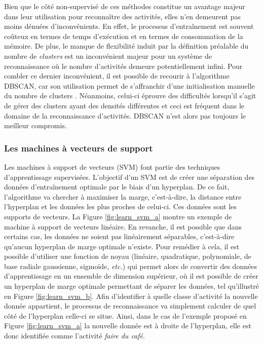 Bien que le côté non-supervisé de ces méthodes constitue un avantage majeur dans leur utilisation pour reconnaître des activités, elles n'en demeurent pas moins dénuées d'inconvénients. En effet, le processus d'entraînement est souvent coûteux en termes de temps d'exécution et en termes de consommation de la mémoire. De plus, le manque de flexibilité induit par la définition préalable du nombre de \textit{clusters} est un inconvénient majeur pour un système de reconnaissance où le nombre d'activités demeure potentiellement infini. Pour combler ce dernier inconvénient, il est possible de recourir à l'algorithme \ac{DBSCAN}, car son utilisation permet de s'affranchir d'une initialisation manuelle du nombre de clusters \citep{Gan2015}. Néanmoins, celui-ci éprouve des difficultés lorsqu'il s'agit de gérer des clusters ayant des densités différentes et ceci est fréquent dans le domaine de la reconnaissance d'activités. \acs{DBSCAN} n'est alors pas toujours le meilleur compromis.

\subsubsection{Les machines à vecteurs de support}

Les machines à support de vecteurs (\ac{SVM}) \citep{Cortes1995} font partie des techniques d'apprentissage supervisées. L'objectif d'un \acs{SVM} est de créer une séparation des données d'entraînement optimale par le biais d'un hyperplan. De ce fait, l'algorithme va chercher à maximiser la marge, c'est-à-dire, la distance entre l'hyperplan et les données les plus proches de celui-ci. Ces données sont les supports de vecteurs. La Figure \ref{fig:learn_svm_a} montre un exemple de machine à support de vecteurs linéaire. En revanche, il est possible que dans certains cas, les données ne soient pas linéairement séparables, c'est-à-dire qu'aucun hyperplan de marge optimale n'existe. Pour remédier à cela, il est possible d'utiliser une fonction de noyau (linéaire, quadratique, polynomiale, de base radiale gaussienne, sigmoïde, \textit{etc.}) qui permet alors de convertir des données d'apprentissage en un ensemble de dimension supérieur, où il est possible de créer un hyperplan de marge optimale permettant de séparer les données, tel qu'illustré en Figure \ref{fig:learn_svm_b}. Afin d'identifier à quelle classe d'activité la nouvelle donnée appartient, le processus de reconnaissance va simplement calculer de quel côté de l'hyperplan celle-ci se situe. Ainsi, dans le cas de l'exemple proposé en Figure \ref{fig:learn_svm_a} la nouvelle donnée est à droite de l'hyperplan, elle est donc identifiée comme l'activité \og \textit{faire du café}\fg.

